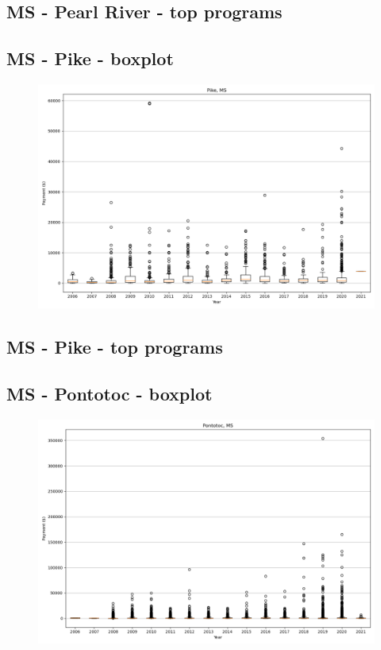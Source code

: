 \subsection*{MS - Pearl River - top programs}

\newpage
\subsection*{MS - Pike - boxplot}
\begin{figure}[h]
\centering
\includegraphics[width=7in]{../output/boxplots/counties/Pike-MS_boxplot.png}
\end{figure}


\subsection*{MS - Pike - top programs}

\newpage
\subsection*{MS - Pontotoc - boxplot}
\begin{figure}[h]
\centering
\includegraphics[width=7in]{../output/boxplots/counties/Pontotoc-MS_boxplot.png}
\end{figure}


